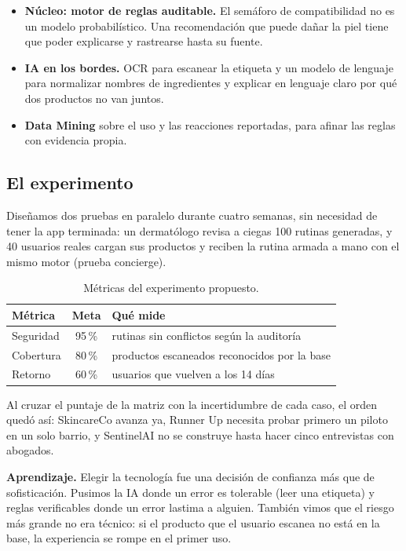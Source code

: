 \documentclass[11pt,a4paper]{article}
\newcommand{\clave}[1]{%
  \par\smallskip\noindent
  \colorbox{suave}{\begin{minipage}{\dimexpr\linewidth-2\fboxsep\relax}
  \textbf{\color{acento}Aprendizaje.} #1
  \end{minipage}}\par\smallskip}
\begin{document}
\begin{itemize}
  \item \textbf{Núcleo: motor de reglas auditable.} El semáforo de compatibilidad no es un modelo probabilístico. Una recomendación que puede dañar la piel tiene que poder explicarse y rastrearse hasta su fuente.
  \item \textbf{IA en los bordes.} OCR para escanear la etiqueta y un modelo de lenguaje para normalizar nombres de ingredientes y explicar en lenguaje claro por qué dos productos no van juntos.
  \item \textbf{Data Mining} sobre el uso y las reacciones reportadas, para afinar las reglas con evidencia propia.
\end{itemize}

\subsection{El experimento}

Diseñamos dos pruebas en paralelo durante cuatro semanas, sin necesidad de tener la app terminada: un dermatólogo revisa a ciegas 100 rutinas generadas, y 40 usuarios reales cargan sus productos y reciben la rutina armada a mano con el mismo motor (prueba concierge).

\begin{table}[h]
\centering
\small
\begin{tabular}{@{}lcl@{}}
\toprule
\textbf{Métrica} & \textbf{Meta} & \textbf{Qué mide} \\
\midrule
Seguridad & 95\,\% & rutinas sin conflictos según la auditoría \\
Cobertura & 80\,\% & productos escaneados reconocidos por la base \\
Retorno & 60\,\% & usuarios que vuelven a los 14 días \\
\bottomrule
\end{tabular}
\caption{Métricas del experimento propuesto.}
\end{table}

Al cruzar el puntaje de la matriz con la incertidumbre de cada caso, el orden quedó así: SkincareCo avanza ya, Runner Up necesita probar primero un piloto en un solo barrio, y SentinelAI no se construye hasta hacer cinco entrevistas con abogados.

\clave{Elegir la tecnología fue una decisión de confianza más que de sofisticación. Pusimos la IA donde un error es tolerable (leer una etiqueta) y reglas verificables donde un error lastima a alguien. También vimos que el riesgo más grande no era técnico: si el producto que el usuario escanea no está en la base, la experiencia se rompe en el primer uso.}
\end{document}
